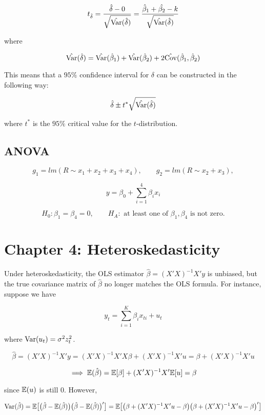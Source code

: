 \[
t_{\hat{\delta}} = \frac{\hat{\delta}  - 0}{\sqrt{\hat{\Var}(\hat{\delta})}} = \frac{\hat{\beta}_1 + \hat{\beta_2} -k}{\sqrt{\hat{\Var}(\hat{\delta})}}
\]

where

\[
\hat{\Var}(\hat{\delta}) = \hat{\Var}(\hat{\beta}_1) + \hat{\Var}(\hat{\beta}_2) + 2 \hat{\Cov}(\hat{\beta}_1, \hat{\beta}_2) 
\]

This means that a \(95\%\) confidence interval for \(\delta\) can be constructed in the following way:

\[
\hat{\delta} \pm t^* \sqrt{\hat{\Var}(\hat{\delta})}
\]

where \(t^*\) is the \(95\%\) critical value for the \(t\)-distribution.

\subsection{ANOVA}

\[
g_1 = lm(R \sim x_1 + x_2 + x_3 + x_4), \qquad g_2 = lm(R \sim x_2 + x_3),
\]

\[
y = \beta_0 + \sum_{i=1}^4 \beta_i x_i
\]

\[
H_0: \beta_1 = \beta_4 = 0, \qquad H_A: \text{ at least one of } \beta_1, \beta_4 \text{ is not zero.}
\]

\section{Chapter 4: Heteroskedasticity}

Under heteroskedasticity, the OLS estimator \(\hat{\beta} = (X'X)^{-1}X'y\) is unbiased, but the true covariance matrix of \(\hat{\beta}\) no longer matches the OLS formula. For instance, suppose we have

\[
y_t = \sum_{i=1}^K \beta_i x_{ti} + u _t
\]

where \(\Var(u_t) = \sigma^2 z_t^2\).

\[
\hat{\beta} = (X'X)^{-1}X'y = (X'X)^{-1}X'X\beta + (X'X)^{-1}X'u = \beta + (X'X)^{-1}X'u 
\]


\[
\implies \E(\hat{\beta}) = \E[\beta] + (X'X)^{-1}X'\E[u] = \beta
\]

since \(\E(u)\) is still 0. However,

\[
\Var(\hat{\beta}) = \E\big[ \big(\hat{\beta} - \E(\hat{\beta}) \big) \big(\hat{\beta} - \E(\hat{\beta}) \big)' \big] = \E \big[\big(\beta + (X'X)^{-1}X'u - \beta \big)\big(\beta + (X'X)^{-1}X'u - \beta \big)' \big]
\]

